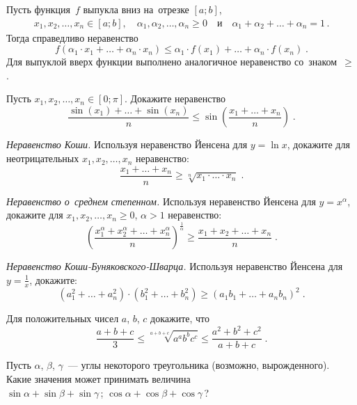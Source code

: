 \begin{problems}

\item{}
Пусть функция~$f$ выпукла вниз на~отрезке $[a;b]$,
\begin{gather*}
    x_1, x_2, \ldots, x_n \in [a; b]
,\quad
    \alpha_1, \alpha_2, \ldots, \alpha_n \geq 0
\quad\text{и}\quad
    \alpha_1 + \alpha_2 + \ldots + \alpha_n = 1
\,.\end{gather*}
Тогда справедливо неравенство
\[
    f(\alpha_1 \cdot x_1 + \ldots + \alpha_n \cdot x_n)
\leq
    \alpha_1 \cdot f(x_1) + \ldots + \alpha_n \cdot f(x_n)
\;.\]
Для выпуклой вверх функции выполнено аналогичное неравенство со~знаком~$\geq$.

\item
Пусть $x_1, x_2, \ldots, x_n \in [0; \pi]$.
Докажите неравенство 
\[
    \frac{\sin(x_1) + \ldots + \sin(x_n)}{n}
\leq
    \sin\left(
        \frac{x_1 + \ldots + x_n}{n}
    \right)
\;.\]

\item\emph{Неравенство Коши.}
Используя неравенство Йенсена для $y = \ln x$, докажите для неотрицательных
$x_1, x_2, \ldots, x_n$ неравенство:
\[
    \frac{x_1 + \ldots + x_n}{n}
\geq
    \sqrt[n]{x_1 \cdot \ldots \cdot x_n}
\;.\]

\item\emph{Неравенство о~среднем степенном.}
Используя неравенство Йенсена для $y = x^{\alpha}$, докажите для
$x_1, x_2, \ldots, x_n \geq 0$, $\alpha > 1$ неравенство:
\[
    \left(
        \frac{
            x_1^{\alpha} + x_2^{\alpha} + \ldots + x_n^{\alpha}
        }{n}
    \right)^{\frac{1}{\alpha}}
\geq
    \frac{x_1 + x_2 + \ldots + x_n}{n}
\;.\]

\item\emph{Неравенство Коши-Буняковского-Шварца.}
Используя неравенство Йенсена для $y = \frac{1}{x}$, докажите:
\[
    (a_1^2 + \ldots + a_n^2) \cdot (b_1^2 + \ldots + b_n^2)
\geq
    (a_1 b_1 + \ldots + a_n b_n)^2
\;.\]

\item
Для положительных чисел $a$, $b$, $c$ докажите, что
\[
    \frac{a + b + c}{3}
\leq
    \sqrt[a+b+c]{a^a b^b c^c}
\leq
    \frac{a^2 + b^2 + c^2}{a + b + c}
\;.\]

\item
Пусть $\alpha$, $\beta$, $\gamma$~--- углы некоторого треугольника
(возможно, вырожденного).
Какие значения может принимать величина
\\
\subproblem $\sin \alpha + \sin \beta + \sin \gamma$\,;
\quad
\subproblem $\cos \alpha + \cos \beta + \cos \gamma$\,?


\end{problems}
